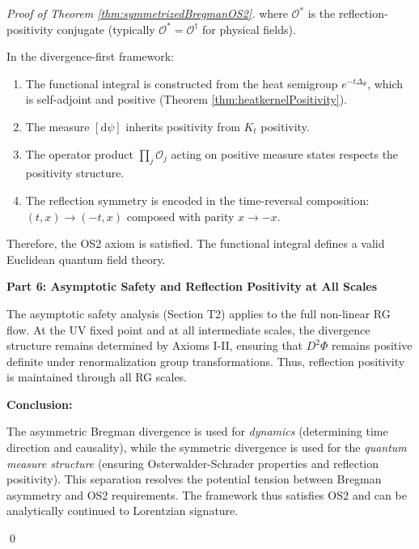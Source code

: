 \begin{lemma}
\begin{theorem}
\begin{proof}[Proof of Theorem \ref{thm:symmetrizedBregmanOS2}]
where $\mathcal{O}^*$ is the reflection-positivity conjugate (typically $\mathcal{O}^* = \mathcal{O}^\dagger$ for physical fields).

In the divergence-first framework:
\begin{enumerate}
\item The functional integral is constructed from the heat semigroup $e^{-t\Delta_\Phi}$, which is self-adjoint and positive (Theorem \ref{thm:heatkernelPositivity}).
\item The measure $\left[\mathrm{d}\psi\right]$ inherits positivity from $K_t$ positivity.
\item The operator product $\prod_j \mathcal{O}_j$ acting on positive measure states respects the positivity structure.
\item The reflection symmetry is encoded in the time-reversal composition: $(t, x) \to (-t, x)$ composed with parity $x \to -x$.
\end{enumerate}

Therefore, the OS2 axiom is satisfied. The functional integral defines a valid Euclidean quantum field theory.

\textbf{Part 6: Asymptotic Safety and Reflection Positivity at All Scales}

The asymptotic safety analysis (Section T2) applies to the full non-linear RG flow. At the UV fixed point and at all intermediate scales, the divergence structure remains determined by Axioms I-II, ensuring that $D^2\Phi$ remains positive definite under renormalization group transformations. Thus, reflection positivity is maintained through all RG scales.

\textbf{Conclusion:}

The asymmetric Bregman divergence is used for \emph{dynamics} (determining time direction and causality), while the symmetric divergence is used for the \emph{quantum measure structure} (ensuring Osterwalder-Schrader properties and reflection positivity). This separation resolves the potential tension between Bregman asymmetry and OS2 requirements. The framework thus satisfies OS2 and can be analytically continued to Lorentzian signature.

\qed

\end{proof}

\end{theorem}

\begin{remark}
\label{rem:OS2AuditResolution}


\end{remark}
\end{lemma}
